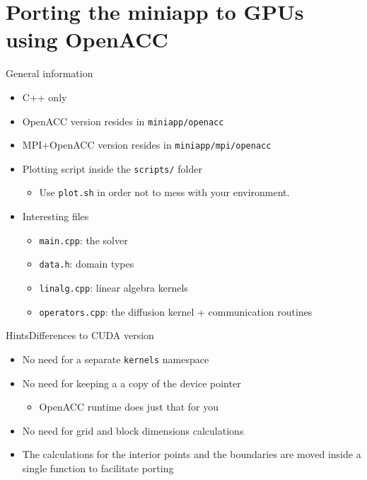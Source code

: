 \documentclass[12pt,aspectratio=169]{beamer}
\newcommand\shinline[2][]{\lstinline[style=shstyle,basicstyle=\ttfamily,#1]!#2!}
\begin{document}
\part{Porting the miniapp to GPUs using OpenACC}

\begin{frame}[fragile]{General information}
  \begin{itemize}
  \item C++ only
  \item OpenACC version resides in \shinline{miniapp/openacc}
  \item MPI+OpenACC version resides in \shinline{miniapp/mpi/openacc}
  \item Plotting script inside the \shinline{scripts/} folder
    \begin{itemize}
    \item Use \shinline{plot.sh} in order not to mess with your environment.
    \end{itemize}
  \item Interesting files
    \begin{itemize}
    \item\shinline{main.cpp}: the solver
    \item\shinline{data.h}: domain types
    \item\shinline{linalg.cpp}: linear algebra kernels
    \item\shinline{operators.cpp}: the diffusion kernel + communication routines
    \end{itemize}
  \end{itemize}
\end{frame}

\begin{frame}{Hints}{Differences to CUDA version}
  \begin{itemize}
  \item No need for a separate \texttt{kernels} namespace
  \item No need for keeping a a copy of the device pointer
    \begin{itemize}
    \item OpenACC runtime does just that for you
    \end{itemize}
  \item No need for grid and block dimensions calculations
  \item The calculations for the interior points and the boundaries are moved
    inside a single function to facilitate porting
  \end{itemize}
\end{frame}
\end{document}
